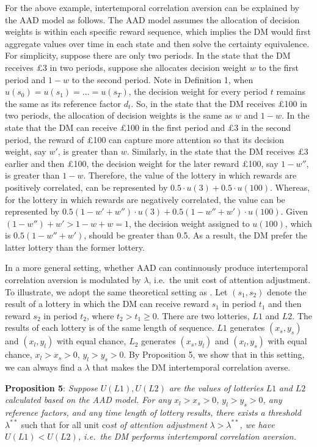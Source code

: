 \documentclass[
  12pt,
]{article}
\begin{document}
For the above example, intertemporal correlation aversion can be
explained by the AAD model as follows. The AAD model assumes the
allocation of decision weights is within each specific reward sequence,
which implies the DM would first aggregate values over time in each
state and then solve the certainty equivalence. For simplicity, suppose
there are only two periods. In the state that the DM receives £3 in two
periods, suppose she allocates decision weight \(w\) to the first period
and \(1-w\) to the second period. Note in Definition 1, when
\(u(s_0)=u(s_1)=...=u(s_T)\), the decision weight for every period \(t\)
remains the same as its reference factor \(d_t\). So, in the state that
the DM receives £100 in two periods, the allocation of decision weights
is the same as \(w\) and \(1-w\). In the state that the DM can receive
£100 in the first period and £3 in the second period, the reward of £100
can capture more attention so that its decision weight, say \(w'\), is
greater than \(w\). Similarly, in the state that the DM receives £3
earlier and then £100, the decision weight for the later reward £100,
say \(1-w''\), is greater than \(1-w\). Therefore, the value of the
lottery in which rewards are positively correlated, can be represented
by \(0.5\cdot u(3)+0.5\cdot u(100)\). Whereas, for the lottery in which
rewards are negatively correlated, the value can be represented by
\(0.5(1-w'+w'')\cdot u(3)+0.5(1-w''+w')\cdot u(100)\). Given
\((1-w'')+w'>1-w+w=1\), the decision weight assigned to \(u(100)\),
which is \(0.5(1-w''+w')\), should be greater than 0.5. As a result, the
DM prefer the latter lottery than the former lottery.

In a more general setting, whether AAD can continuously produce
intertemporal correlation aversion is modulated by \(\lambda\), i.e.~the
unit cost of attention adjustment. To illustrate, we adopt the same
theoretical setting as \citet{bommier2005risk}. Let \((s_1,s_2)\) denote
the result of a lottery in which the DM can receive reward \(s_1\) in
period \(t_1\) and then reward \(s_2\) in period \(t_2\), where
\(t_2>t_1\geq 0\). There are two lotteries, \(L1\) and \(L2\). The
results of each lottery is of the same length of sequence. \(L1\)
generates \((x_s,y_s)\) and \((x_l,y_l)\) with equal chance, \(L_2\)
generates \((x_s,y_l)\) and \((x_l,y_s)\) with equal chance,
\(x_l>x_s>0\), \(y_l>y_s>0\). By Proposition 5, we show that in this
setting, we can always find a \(\lambda\) that makes the DM
intertemporal correlation averse.

\noindent \textbf{Proposition 5}: \emph{Suppose} \(U(L1), U(L2)\)
\emph{are the values of lotteries} \(L1\) \emph{and} \(L2\)
\emph{calculated based on the AAD model. For any} \(x_l>x_s>0\)\emph{,}
\(y_l>y_s>0\)\emph{, any reference factors, and any time length of
lottery results, there exists} \emph{a threshold} \(\lambda^{**}\) such
that for all unit co\emph{st of attention adjustment}
\(\lambda>\lambda^{**}\)\emph{, we have} \(U(L1)<U(L2)\)\emph{, i.e.~the
DM performs intertemporal correlation aversion.}
\end{document}

